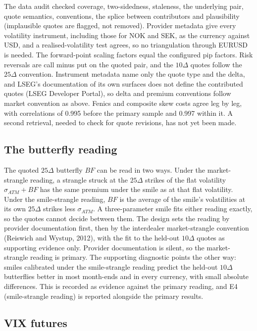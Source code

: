 \documentclass[11pt]{article}
\theoremstyle{result}
\newcommand{\D}{\Delta}
\begin{document}
The data audit checked coverage, two-sidedness, staleness, the underlying pair, quote semantics, conventions, the splice between contributors and plausibility (implausible quotes are flagged, not removed). Provider metadata give every volatility instrument, including those for NOK and SEK, as the currency against USD, and a realised-volatility test agrees, so no triangulation through EURUSD is needed. The forward-point scaling factors equal the configured pip factors. Risk reversals are call minus put on the quoted pair, and the $10\D$ quotes follow the $25\D$ convention. Instrument metadata name only the quote type and the delta, and LSEG's documentation of its own surfaces does not define the contributed quotes (LSEG Developer Portal), so delta and premium conventions follow market convention as above. Fenics and composite skew costs agree leg by leg, with correlations of 0.995 before the primary sample and 0.997 within it. A second retrieval, needed to check for quote revisions, has not yet been made.

\subsection{The butterfly reading}\label{sec:bf}

The quoted $25\D$ butterfly $BF$ can be read in two ways. Under the market-strangle reading, a strangle struck at the $25\D$ strikes of the flat volatility $\sigma_{ATM}+BF$ has the same premium under the smile as at that flat volatility. Under the smile-strangle reading, $BF$ is the average of the smile's volatilities at its own $25\D$ strikes less $\sigma_{ATM}$. A three-parameter smile fits either reading exactly, so the quotes cannot decide between them. The design sets the reading by provider documentation first, then by the interdealer market-strangle convention (Reiswich and Wystup, 2012), with the fit to the held-out $10\D$ quotes as supporting evidence only. Provider documentation is silent, so the market-strangle reading is primary. The supporting diagnostic points the other way: smiles calibrated under the smile-strangle reading predict the held-out $10\D$ butterflies better in most month-ends and in every currency, with small absolute differences. This is recorded as evidence against the primary reading, and E4 (smile-strangle reading) is reported alongside the primary results.

\subsection{VIX futures}
\end{document}

